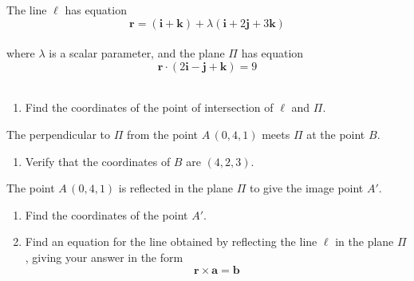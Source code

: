 \documentclass[leqno]{article}
\begin{document}
\begin{enumerate}[
  label=\textbf{\arabic*.},
  leftmargin=*,
  topsep=0pt,
  partopsep=0pt,
  parsep=0pt
]
The line $\ell$ has equation
\[
\mathbf{r}=(\mathbf{i}+\mathbf{k})+\lambda(\mathbf{i}+2\mathbf{j}+3\mathbf{k})
\] \\
where $\lambda$ is a scalar parameter, and the plane $\Pi$ has equation
\[
\mathbf{r}\cdot(2\mathbf{i}-\mathbf{j}+\mathbf{k})=9
\] \\
\begin{enumerate}[label=\textbf{(\alph*)}]
  \item Find the coordinates of the point of intersection of $\ell$ and $\Pi$.  \\
\end{enumerate}
The perpendicular to $\Pi$ from the point $A\,(0,4,1)$ meets $\Pi$ at the point $B$. \\
\begin{enumerate}[label=\textbf{(\alph*)}, resume]
  \item Verify that the coordinates of $B$ are $(4,2,3)$.  \\
\end{enumerate}
The point $A\,(0,4,1)$ is reflected in the plane $\Pi$ to give the image point $A'$. \\
\begin{enumerate}[label=\textbf{(\alph*)}, resume]
  \item Find the coordinates of the point $A'$.  \\
  \item Find an equation for the line obtained by reflecting the line $\ell$ in the plane $\Pi$, giving your answer in the form
  \[
  \mathbf{r}\times\mathbf{a}=\mathbf{b}
  \]
\end{enumerate}

\newpage

\questionitem


\end{enumerate}
\end{document}
